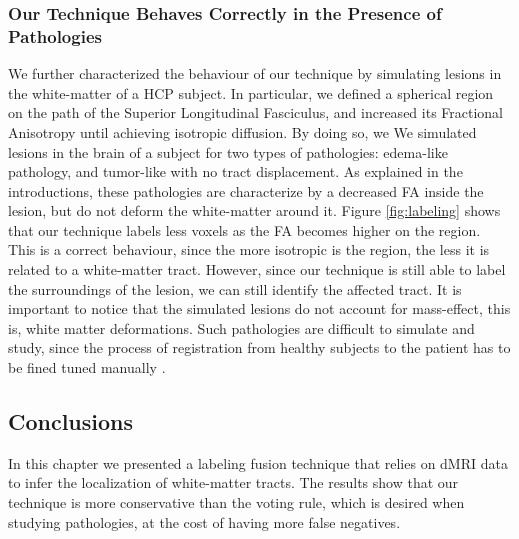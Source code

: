 \subsubsection{Our Technique Behaves Correctly in the Presence of Pathologies}

We further characterized the behaviour of our technique by simulating lesions
in the white-matter of a HCP subject. In particular, we defined a spherical region
on the path of the Superior Longitudinal Fasciculus, and increased its
Fractional Anisotropy until achieving isotropic diffusion. By doing so, we
We simulated lesions in the brain of a subject for two types of pathologies:
edema-like pathology, and tumor-like with no tract displacement. As explained
in the introductions, these pathologies are characterize by a decreased FA inside
the lesion, but do not deform the white-matter around it. Figure \ref{fig:labeling}
shows that our technique labels less voxels as the FA becomes higher on the
region. This is a correct behaviour, since the more isotropic is the region,
the less it is related to a white-matter tract. However, since our technique
is still able to label the surroundings of the lesion, we can still identify
the affected tract. It is important to notice that the simulated lesions do not
account for mass-effect, this is, white matter deformations. Such pathologies
are difficult to simulate and study, since the process of registration from
healthy subjects to the patient has to be fined tuned manually . 

\subsection{Conclusions}
In this chapter we presented a labeling fusion technique that relies on dMRI
data to infer the localization of white-matter tracts. The results show that
our technique is more conservative than the voting rule, which is desired when
studying pathologies, at the cost of having more false negatives.

